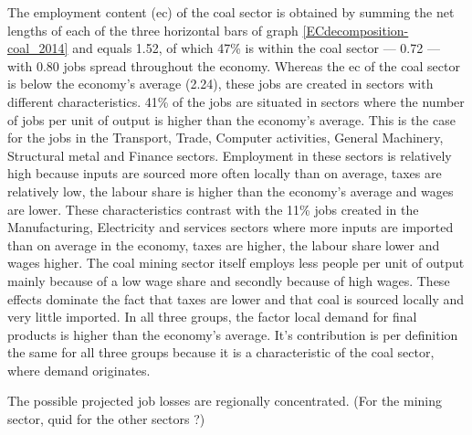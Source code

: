 \documentclass[12pt,english]{article}
\begin{document}
The employment content (ec) of the coal sector is obtained by summing the net lengths of each of the three horizontal bars of graph \ref{ECdecomposition-coal_2014} and equals 1.52, of which 47\% is within the coal sector --- 0.72 --- with 0.80 jobs spread throughout the economy. Whereas the ec of the coal sector is below the economy's average (2.24), these jobs are created in sectors with different characteristics. 41\% of the jobs are situated in sectors where the number of jobs per unit of output is higher than the economy's average. This is the case for the jobs in the Transport, Trade, Computer activities, General Machinery, Structural metal and Finance sectors. Employment in these sectors is relatively high because inputs are sourced more often locally than on average, taxes are relatively low, the labour share is higher than the economy's average and wages are lower. These characteristics contrast with the 11\% jobs created in the Manufacturing, Electricity and services sectors where more inputs are imported than on average in the economy, taxes are higher, the labour share lower and wages higher. The coal mining sector itself employs less people per unit of output mainly because of a low wage share and secondly because of high wages. These effects dominate the fact that taxes are lower and that coal is sourced locally and very little imported. In all three groups, the factor local demand for final products is higher than the economy's average. It's contribution is per definition the same for all three groups because it is a characteristic of the coal sector, where demand originates. %



The possible projected job losses are regionally concentrated. (For the mining sector, quid for the other sectors ?)
\end{document}
